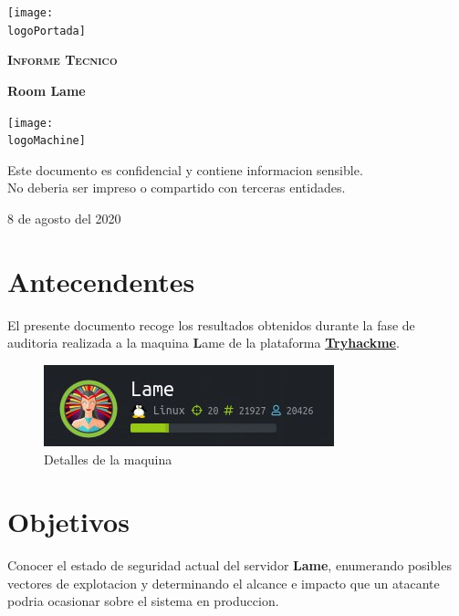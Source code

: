 \documentclass[a4paper]{article}%
\newcommand{\logoPortada}{images/plataforma_logo.jpg}
\newcommand{\machineName}{Lame} %
\newcommand{\logoMachine}{images/maquina_logo.png} %
\newcommand{\startDate}{8 de agosto del 2020}
\begin{document}
	\cfoot{\thepage}
	\begin{titlepage}
	\centering
	\texttt{[image: \\logoPortada]}\par\vspace{1cm}
	{\scshape\LARGE \textbf{Informe Tecnico}\par }
	\vspace{0.2cm}
	{\Huge\bfseries\textcolor{greenPortada}{Room \machineName}\par}
	\vfill\vfill
	\texttt{[image: \\logoMachine]}\par\vspace{1cm}
	\vfill
	\begin{tcolorbox}[colback=red!5!white,colframe=red!75!black]
		\centering
		Este documento es confidencial y contiene informacion sensible.\\No deberia
		ser impreso o compartido con terceras entidades.
	\end{tcolorbox}	
	\vfill
	{\large \startDate\par}
	\vfill
	\end{titlepage}
	\clearpage
	\tableofcontents
	\clearpage
	\section{Antecendentes}
	El presente documento recoge los resultados obtenidos durante la fase de auditoria
	realizada a la maquina {\textbf\machineName} de la plataforma 
	\href{https://tryhackme.com}{\textbf{Tryhackme}}. 
	\vspace{0.2cm}

	\begin{figure}[h]
	\centering
	\includegraphics[width=\textwidth]{images/informacion_maquina.jpg}
	\caption{Detalles de la maquina}
	\end{figure}
	
	\section{Objetivos}
	Conocer el estado de seguridad actual del servidor \textbf{\machineName}, enumerando
	posibles vectores de explotacion y determinando el alcance e impacto que un atacante
	podria ocasionar sobre el sistema en produccion.
	
\end{document}
